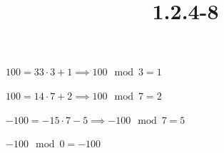 \documentclass{article}
\title{1.2.4-8}
\begin{document}
\maketitle

$100 = 33 \cdot 3 + 1 \implies 100 \mod 3 = 1$

$100 = 14 \cdot 7 + 2 \implies 100 \mod 7 =  2$

$-100 = -15 \cdot 7 - 5 \implies -100 \mod 7 = 5$

$-100 \mod 0 = -100$
\end{document}
